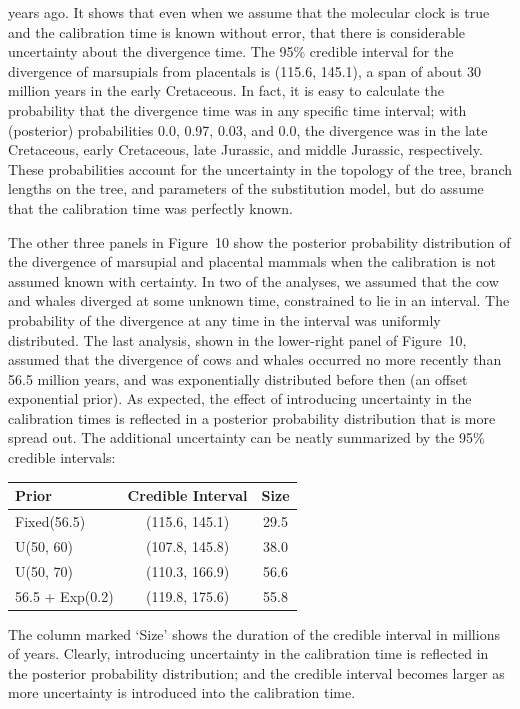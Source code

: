 \documentclass{svmult}
\begin{document}
years ago. It shows that even when we assume that the molecular clock is true and the calibration time is known without error, that there is considerable uncertainty about
the divergence time. The 95\% credible interval for the divergence of marsupials from placentals is (115.6, 145.1), a span of about 30 million years in the early Cretaceous.
In fact, it is easy to calculate the probability that the divergence time was in any specific time interval; with (posterior) probabilities 0.0, 0.97, 0.03, and 0.0, the divergence was
in the late Cretaceous, early Cretaceous, late Jurassic, and middle Jurassic, respectively. These probabilities account for the uncertainty in the topology of the tree, branch lengths
on the tree, and parameters of the substitution model, but do assume that the calibration time was perfectly known.

The other three panels in Figure~10 show the posterior probability distribution of the divergence of marsupial and placental mammals when the calibration is not assumed
known with certainty. In two of the analyses, we assumed that the cow and whales diverged at some unknown time, constrained to lie in an interval. The probability of
the divergence at any time in the interval was uniformly distributed. The last analysis, shown in the lower-right panel of Figure~10, assumed that the divergence of cows
and whales occurred no more recently than 56.5 million years, and was exponentially distributed before then (an offset exponential prior). As expected, the effect of introducing
uncertainty in the calibration times is reflected in a posterior probability distribution that is more spread out. The additional uncertainty can be neatly summarized by
the 95\% credible intervals:
\begin{center}
\begin{tabular}{lcc}
Prior & Credible Interval &Size \\ \hline
Fixed(56.5) & (115.6, 145.1) & 29.5\\
U(50, 60) & (107.8, 145.8) & 38.0 \\
U(50, 70) & (110.3, 166.9) & 56.6\\
56.5 + Exp(0.2) & (119.8, 175.6) & 55.8\\ 
\end{tabular}
\end{center}
The column marked `Size' shows the duration of the credible interval in millions of years. Clearly, introducing uncertainty in the calibration time is reflected in the posterior probability
distribution; and the credible interval becomes larger as more uncertainty is introduced into the calibration time.
\end{document}
